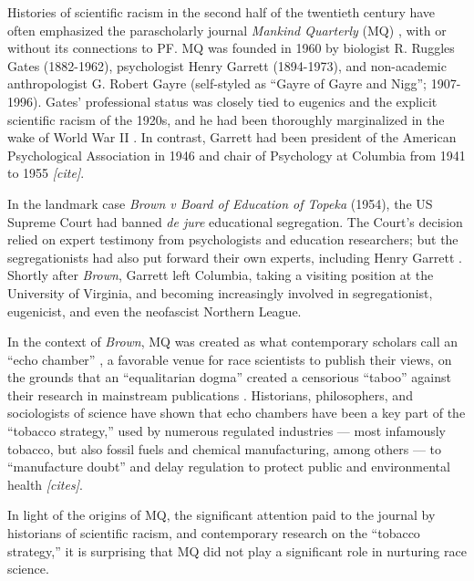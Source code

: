 \documentclass[12pt]{article}
\begin{document}
Histories of scientific racism in the second half of the twentieth
century have often emphasized the parascholarly journal \emph{Mankind
Quarterly} (MQ) \cite{
MehlerFoundationFascismNew1989,
WinstonScienceServiceFar1998,
SchafferScientificRacismAgain2007,
SainiSuperiorReturnRace2019,
WinstonScientificRacismNorth2020,
AdamsMisAppropriationBiological2021,
SainiDraperMillionsPhilanthropic2022
}, with or without its connections to PF. MQ was founded in 1960 by
biologist R. Ruggles Gates (1882-1962), psychologist Henry Garrett
(1894-1973), and non-academic anthropologist G. Robert Gayre
(self-styled as ``Gayre of Gayre and Nigg''; 1907-1996). Gates'
professional status was closely tied to eugenics and the explicit
scientific racism of the 1920s, and he had been thoroughly marginalized
in the wake of World War II \cite{WinstonScienceServiceFar1998}. In
contrast, Garrett had been president of the American Psychological
Association in 1946 and chair of Psychology at Columbia from 1941 to
1955 \emph{{[}cite{]}}.

In the landmark case \emph{Brown v Board of Education of Topeka} (1954),
the US Supreme Court had banned \emph{de jure} educational segregation.
The Court's decision relied on expert testimony from psychologists and
education researchers; but the segregationists had also put forward
their own experts, including Henry Garrett
\cite{WinstonScienceServiceFar1998, JacksonScienceSegregationRace2005, SchafferScientificRacismAgain2007}.
Shortly after \emph{Brown}, Garrett left Columbia, taking a visiting
position at the University of Virginia, and becoming increasingly
involved in segregationist, eugenicist, and even the neofascist Northern
League.

In the context of \emph{Brown}, MQ was created as what contemporary
scholars call an ``echo chamber''
\cite{FernandezPintoKnowBetterNot2017}, a favorable venue for race
scientists to publish their views, on the grounds that an ``equalitarian
dogma'' created a censorious ``taboo'' against their research in
mainstream publications
\cite{TuckerFundingScientificRacism2002, JacksonMythicalTabooRace2020}.
Historians, philosophers, and sociologists of science have shown that
echo chambers have been a key part of the ``tobacco strategy,'' used by
numerous regulated industries --- most infamously tobacco, but also
fossil fuels and chemical manufacturing, among others --- to
``manufacture doubt'' and delay regulation to protect public and
environmental health \emph{{[}cites{]}}.

In light of the origins of MQ, the significant attention paid to the
journal by historians of scientific racism, and contemporary research on
the ``tobacco strategy,'' it is surprising that MQ did not play a
significant role in nurturing race science.
\end{document}
